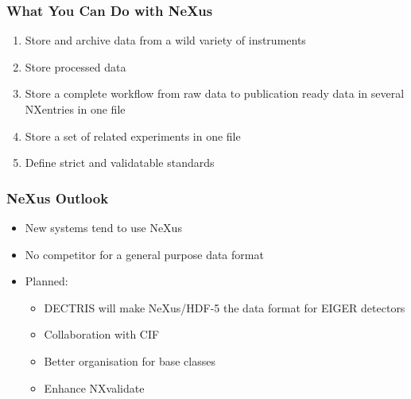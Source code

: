 \documentclass{beamer}
\begin{document}
\begin{frame} \frametitle{What You Can Do with NeXus}
\begin{enumerate}
\item Store and archive data from a wild variety of instruments
\item Store processed data
\item Store a complete workflow from raw data to publication ready data in several 
 NXentries in one file
\item Store a set of related experiments in one file
\item Define strict and validatable standards 
\end{enumerate}
\end{frame}

\begin{frame} \frametitle{NeXus Outlook}
\begin{itemize}
\item New systems tend to use NeXus
\item No competitor for a general purpose data format
\item Planned: 
\begin{itemize}
\item DECTRIS will make NeXus/HDF-5 the data format for EIGER detectors
\item Collaboration with CIF
\item Better organisation for base classes
\item Enhance NXvalidate
\end{itemize}
\end{itemize}
\end{frame}
\end{document}

